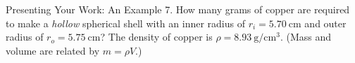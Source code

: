 \documentclass[12pt,compress,aspectratio=169]{beamer}
\begin{document}
\begin{frame}{Presenting Your Work: An Example}
  7. How many grams of copper are required to make a \emph{hollow}
  spherical shell with an inner radius of $r_i=\SI{5.70}{\centi\metre}$ and
  outer radius of $r_o=\SI{5.75}{\centi\metre}$? The density of copper is
  $\rho=\SI{8.93}{\gram\per\centi\metre\cubed}$. (Mass and volume are related
  by $m=\rho V$.)
%
%
\end{frame}
\end{document}
